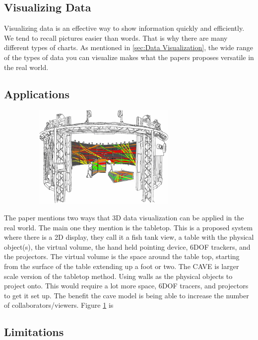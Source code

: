 \documentclass{sig-alternate}
\begin{document}
\subsection{Visualizing Data}
\label{sec:Visualizing Data}

Visualizing data is an effective way to show information quickly and efficiently. We tend to recall pictures easier than words. That is why there are many different types of charts. As mentioned in \ref{sec:Data Visualization}, the wide range of the types of data you can visualize makes what the papers proposes versatile in the real world.      

\subsection{Applications}
\label{sec:Applications}

\begin{figure}
	\includegraphics[width=8.5cm, height=5cm]{Cave}
	\caption{\cite{3D}}
	\label{fig:Cave}
\end{figure}

The paper mentions two ways that 3D data visualization can be applied in the real world. The main one they mention is the tabletop. This is a proposed system where there is a 2D display, they call it a fish tank view, a table with the physical object(s), the virtual volume, the hand held pointing device, 6DOF trackers, and the projectors. The virtual volume is the space around the table top, starting from the surface of the table extending up a foot or two. The CAVE is larger scale version of the tabletop method. Using walls as the physical objects to project onto. This would require a lot more space, 6DOF tracers, and projectors to get it set up. The benefit the cave model is being able to increase the number of collaborators/viewers. Figure \ref{fig:Cave} is 

\subsection{Limitations}
\label{sec:Limitations}
\end{document}
